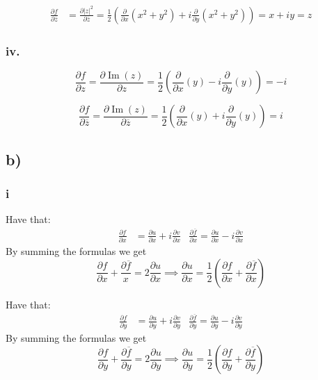 \documentclass{article}
\begin{document}
\begin{align*}\frac{\partial f}{\partial \overline{z}} &= \frac{\partial |z|^2}{\partial \overline{z}} =\frac{1}{2}\left(\frac{\partial}{\partial x} (x^2 + y^2)  + i \frac{\partial}{\partial y} (x^2 +y^2) \right) = x + iy = z\end{align*}


  \subsubsection*{iv.}
  \[\frac{\partial f}{\partial z} = \frac{\partial \operatorname{Im}(z)}{\partial z} =\frac{1}{2}\left(\frac{\partial}{\partial x} (y)  - i \frac{\partial}{\partial y} (y) \right) = -i \]

  \[\frac{\partial f}{\partial \overline{z}} = \frac{\partial \operatorname{Im}(z)}{\partial \overline{z}} =\frac{1}{2}\left(\frac{\partial}{\partial x} (y)  + i \frac{\partial}{\partial y} (y) \right) = i \]


  \subsection*{b)}
  \subsubsection*{i}
  Have that:
  \begin{align*}
    \frac{\partial f}{\partial x} &= \frac{\partial u}{\partial x} + i\frac{\partial v}{\partial x}
    &\frac{\partial \overline{f}}{\partial x} = \frac{\partial u}{\partial x} - i\frac{\partial v}{\partial x}
  \end{align*}
  By summing the formulas we get
  \[
  \frac{\partial f}{\partial x} +\frac{\partial  \overline{f}}{x}= 2\frac{\partial u}{\partial x} \implies \frac{\partial u}{\partial x} = \frac{1}{2}\left(\frac{\partial f}{\partial x} + \frac{\partial \overline{f}}{\partial x}\right)
  \]


  Have that:
  \begin{align*}
    \frac{\partial f}{\partial y} &= \frac{\partial u}{\partial y} + i\frac{\partial v}{\partial y}
    &\frac{\partial \overline{f}}{\partial y} = \frac{\partial u}{\partial y} - i\frac{\partial v}{\partial y}
  \end{align*}
  By summing the formulas we get
  \[\frac{\partial f}{\partial y} + \frac{\partial \overline{f}}{\partial y} = 2\frac{\partial u}{\partial y} \implies \frac{\partial u}{\partial y} = \frac{1}{2}\left(\frac{\partial f}{\partial y} + \frac{\partial \overline{f}}{\partial y}\right)\]
\end{document}
